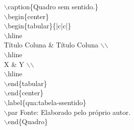 {\begin{tcolorbox}[colback=blue!5!white,colframe=green!75!blue,title= Comando Acrescenta Quadro, fontlower=\footnotesize]
\tab $\backslash$caption\{Quadro sem sentido.\}\\
\tab $\backslash$begin\{center\}\\
\tab \tab $\backslash$begin\{tabular\}\{|c|c|\}\\
\tab \tab \tab $\backslash$hline\\
\tab \tab \tab Título Coluna \& Título Coluna $\backslash$$\backslash$\\
\tab \tab \tab $\backslash$hline\\
\tab \tab \tab X \& Y $\backslash$$\backslash$\\
\tab \tab \tab $\backslash$hline\\
\tab \tab $\backslash$end\{tabular\}\\
\tab $\backslash$end\{center\}\\
\tab $\backslash$label\{qua:tabela-ssentido\}\\
\tab $\backslash$par Fonte: Elaborado pelo próprio autor.\\
$\backslash$end\{Quadro\}\\
\end{tcolorbox}
}

